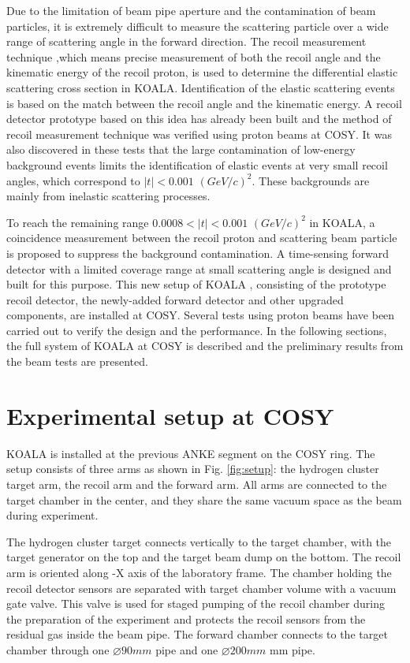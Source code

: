 \documentclass[number,5p]{elsarticle}
\begin{document}
Due to the limitation of beam pipe aperture and the contamination of beam particles,
it is extremely difficult to measure the scattering particle over a wide range of scattering angle in the forward direction.
The recoil measurement technique ,which means precise measurement of  both the recoil angle and the kinematic energy of the recoil proton, 
is used to determine the differential elastic scattering cross section in KOALA.
Identification of the elastic scattering events is based on the match between the recoil angle and the kinematic energy.
A recoil detector prototype based on this idea has already been built
\cite{recoil_article} and the method of recoil measurement technique was verified using proton beams at COSY.
It was also discovered in these tests that the large contamination of low-energy
background events limits the identification of elastic events at very small recoil angles,
which correspond to \(|t| < 0.001\) \((GeV/c)^2\). These backgrounds are mainly
from inelastic scattering processes.

To reach the remaining range \(0.0008 < |t| < 0.001\) \((GeV/c)^2\) in KOALA, a coincidence measurement between the recoil proton and scattering beam particle is proposed to suppress the background contamination.
A time-sensing forward detector with a limited coverage range at small scattering angle is designed and built for this purpose. 
This new setup of KOALA , consisting of the prototype recoil detector, the newly-added forward detector and other upgraded components,  are installed at COSY.
Several tests using proton beams have been carried out to verify the design and the performance.
In the following sections,  the full system of KOALA at COSY is described and the preliminary results from the beam tests are presented.

\section{Experimental setup at COSY}
\label{sec:setup}

KOALA is installed at the previous ANKE segment on the COSY ring.
The setup consists of three arms as shown in Fig. \ref{fig:setup}: the hydrogen
cluster target arm, the recoil arm and the forward arm.
All arms are connected to the target chamber in the center, and they share the same vacuum space as the beam during experiment.

The hydrogen cluster target connects vertically to the target chamber, with the target generator on the top and the target beam dump on the bottom.
The recoil arm is oriented along -X axis of the laboratory frame.
The chamber holding the recoil detector sensors are separated with target
chamber volume with a vacuum gate valve.
This valve is used for staged pumping of the recoil chamber during the
preparation of the experiment and protects the recoil sensors from the residual
gas inside the beam pipe.
The forward chamber connects to the target chamber through one \(\diameter 90
mm\) pipe and one \(\diameter 200 mm\) mm pipe. 
\end{document}
